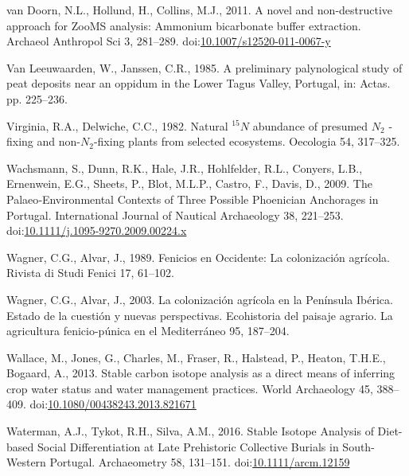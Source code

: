 \documentclass[review]{elsarticle} %
\newlength{\cslhangindent}
\newenvironment{CSLReferences}[2] %
 {%
  \setlength{\parindent}{0pt}
  \ifodd #1 \everypar{\setlength{\hangindent}{\cslhangindent}}\ignorespaces\fi
  \ifnum #2 > 0
  \setlength{\parskip}{#2\baselineskip}
  \fi
 }%
 {}
\begin{document}
\begin{CSLReferences}{1}{0}
\leavevmode{}%
van Doorn, N.L., Hollund, H., Collins, M.J., 2011. A novel and non-destructive approach for {ZooMS} analysis: Ammonium bicarbonate buffer extraction. Archaeol Anthropol Sci 3, 281--289. doi:\href{https://doi.org/10.1007/s12520-011-0067-y}{10.1007/s12520-011-0067-y}

\leavevmode{}%
Van Leeuwaarden, W., Janssen, C.R., 1985. A preliminary palynological study of peat deposits near an oppidum in the {Lower Tagus Valley}, {Portugal}, in: Actas. pp. 225--236.

\leavevmode{}%
Virginia, R.A., Delwiche, C.C., 1982. Natural \(^{15}N\) abundance of presumed \(N_{2}\) -fixing and non-\(N_{2}\)-fixing plants from selected ecosystems. Oecologia 54, 317--325.

\leavevmode{}%
Wachsmann, S., Dunn, R.K., Hale, J.R., Hohlfelder, R.L., Conyers, L.B., Ernenwein, E.G., Sheets, P., Blot, M.L.P., Castro, F., Davis, D., 2009. The {Palaeo}‐{Environmental Contexts} of {Three Possible Phoenician Anchorages} in {Portugal}. International Journal of Nautical Archaeology 38, 221--253. doi:\href{https://doi.org/10.1111/j.1095-9270.2009.00224.x}{10.1111/j.1095-9270.2009.00224.x}

\leavevmode{}%
Wagner, C.G., Alvar, J., 1989. Fenicios en {Occidente}: La colonización agrícola. Rivista di Studi Fenici 17, 61--102.

\leavevmode{}%
Wagner, C.G., Alvar, J., 2003. La colonización agrícola en la {Península Ibérica}. {Estado} de la cuestión y nuevas perspectivas. Ecohistoria del paisaje agrario. La agricultura fenicio-púnica en el Mediterráneo 95, 187--204.

\leavevmode{}%
Wallace, M., Jones, G., Charles, M., Fraser, R., Halstead, P., Heaton, T.H.E., Bogaard, A., 2013. Stable carbon isotope analysis as a direct means of inferring crop water status and water management practices. World Archaeology 45, 388--409. doi:\href{https://doi.org/10.1080/00438243.2013.821671}{10.1080/00438243.2013.821671}

\leavevmode{}%
Waterman, A.J., Tykot, R.H., Silva, A.M., 2016. Stable {Isotope Analysis} of {Diet}-based {Social Differentiation} at {Late Prehistoric Collective Burials} in {South}-{Western Portugal}. Archaeometry 58, 131--151. doi:\href{https://doi.org/10.1111/arcm.12159}{10.1111/arcm.12159}


\end{CSLReferences}
\end{document}
